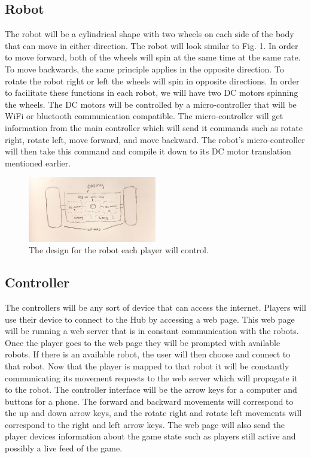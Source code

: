 \documentclass[11pt]{ieeeconf}
\begin{document}
\subsection{Robot}

The robot will be a cylindrical shape with two wheels on each side of the body that can move in either direction. The robot will look similar to Fig. 1. In order to move forward, both of the wheels will spin at the same time at the same rate. To move backwards, the same principle applies in the opposite direction. To rotate the robot right or left the wheels will spin in opposite directions. In order to facilitate these functions in each robot, we will have two DC motors spinning the wheels. The DC motors will be controlled by a micro-controller that will be WiFi or bluetooth communication compatible. The micro-controller will get information from the main controller which will send it commands such as rotate right, rotate left, move forward, and move backward. The robot's micro-controller will then take this command and compile it down to its DC motor translation mentioned earlier.

 \begin{figure}[h]
  \centering
      \includegraphics[width=0.5\textwidth]{images/RobotSketch.pdf}
        \caption{The design for the robot each player will control.}
        \label{RobotFig}
\end{figure}

\subsection{Controller}

The controllers will be any sort of device that can access the internet. Players will use their device to connect to the Hub by accessing a web page. This web page will be running a web server that is in constant communication with the robots. Once the player goes to the web page they will be prompted with available robots. If there is an available robot, the user will then choose and connect to that robot. Now that the player is mapped to that robot it will be constantly communicating its movement requests to the web server which will propagate it to the robot. The controller interface will be the arrow keys for a computer and buttons for a phone. The forward and backward movements will correspond to the up and down arrow keys, and the rotate right and rotate left movements will correspond to the right and left arrow keys. The web page will also send the player devices information about the game state such as players still active and possibly a live feed of the game.
\end{document}
